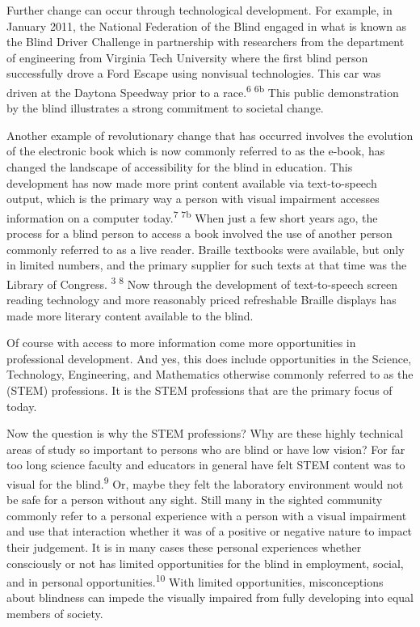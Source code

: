 \documentclass[11.5pt]{sig-alternate} %
\begin{document}
\begin{large}
Further change can occur through technological development. For example, in January 2011, the National Federation of the Blind engaged in what is known as the Blind Driver Challenge in partnership with researchers from the department of engineering from Virginia Tech University where the first blind person successfully drove a Ford Escape using nonvisual technologies. This car was driven at the Daytona Speedway prior to a race.\textsuperscript{6 6b} This public demonstration by the blind illustrates a strong commitment to societal change.

Another example of revolutionary change that has occurred involves the evolution of the electronic book which is now commonly referred to as the e-book, has changed the landscape of accessibility for the blind in education. This development has now made more print content available via text-to-speech output, which is the primary way a person with visual impairment accesses information on a computer today.\textsuperscript{7 7b} When just a few short years ago, the process for a blind person to access a book involved the use of another person commonly referred to as a live reader. Braille textbooks were available, but only in limited numbers, and the primary supplier for such texts at that time was the Library of Congress. \textsuperscript{3 8} Now through the development of text-to-speech screen reading technology and more reasonably priced refreshable Braille displays has made more literary content available to the blind.

Of course with access to more information come more opportunities in professional development. And yes, this does include opportunities in the Science, Technology, Engineering, and Mathematics otherwise commonly referred to as the (STEM) professions. It is the STEM professions that are the primary focus of today.

Now the question is why the STEM professions? Why are these highly technical areas of study so important to persons who are blind or have low vision? For far too long science faculty and educators in general have felt STEM content was to visual for the blind.\textsuperscript{9} Or, maybe they felt the laboratory environment would not be safe for a person without any sight. Still many in the sighted community commonly refer to a personal experience with a person with a visual impairment and use that interaction whether it was of a positive or negative nature to impact their judgement. It is in many cases these personal experiences whether consciously or not has limited opportunities for the blind in employment, social, and in personal opportunities.\textsuperscript{10} With limited opportunities, misconceptions about blindness can impede the visually impaired from fully developing into equal members of society.


\end{large}
\end{document}
